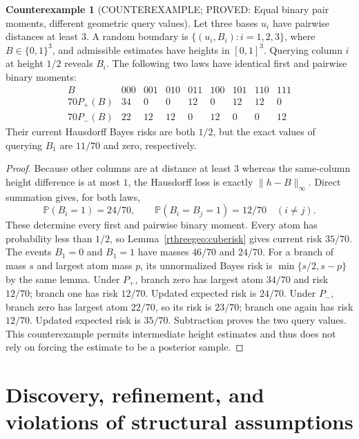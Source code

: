 \documentclass[11pt]{article}
\theoremstyle{definition}
\newtheorem{counterexample}[theorem]{Counterexample}
\theoremstyle{remark}
\begin{document}
\begin{counterexample}[COUNTEREXAMPLE; PROVED: Equal binary pair moments, different geometric query values]
\label{rthreegeo:parity}
Let three bases $u_i$ have pairwise distances at least $3$.
A random boundary is $\{(u_i,B_i):i=1,2,3\}$, where
$B\in\{0,1\}^3$, and admissible estimates have heights in $[0,1]^3$.
Querying column $i$ at height $1/2$ reveals $B_i$.
The following two laws have identical first and pairwise binary moments:
\[
\begin{array}{c|rrrrrrrr}
 B&000&001&010&011&100&101&110&111\\\hline
 70P_+(B)&34&0&0&12&0&12&12&0\\
 70P_-(B)&22&12&12&0&12&0&0&12
\end{array}
\]
Their current Hausdorff Bayes risks are both $1/2$, but the exact values
of querying $B_1$ are $11/70$ and zero, respectively.
\end{counterexample}
\begin{proof}
Because other columns are at distance at least $3$ whereas the
same-column height difference is at most $1$, the Hausdorff loss is
exactly $\|h-B\|_\infty$.
Direct summation gives, for both laws,
\[
 \mathbb P(B_i=1)=24/70,\qquad
 \mathbb P(B_i=B_j=1)=12/70\quad(i\ne j).
\]
These determine every first and pairwise binary moment.
Every atom has probability less than $1/2$, so
Lemma~\ref{rthreegeo:cuberisk} gives current risk $35/70$.
The events $B_1=0$ and $B_1=1$ have masses $46/70$ and $24/70$.
For a branch of mass $s$ and largest atom mass $p$, its unnormalized
Bayes risk is $\min\{s/2,s-p\}$ by the same lemma.
Under $P_+$, branch zero has largest atom $34/70$ and risk $12/70$;
branch one has risk $12/70$. Updated expected risk is $24/70$.
Under $P_-$, branch zero has largest atom $22/70$, so its risk is
$23/70$; branch one again has risk $12/70$. Updated expected risk
is $35/70$. Subtraction proves the two query values.
This counterexample permits intermediate height estimates and thus
does not rely on forcing the estimate to be a posterior sample.
\end{proof}

\section{Discovery, refinement, and violations of structural assumptions}
\end{document}
